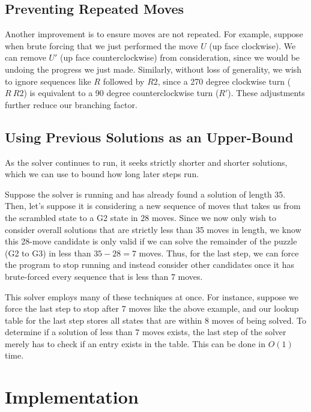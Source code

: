 \documentclass{article}
\begin{document}
\subsection{Preventing Repeated Moves}

Another improvement is to ensure moves are not repeated. For example, suppose when brute forcing that we just performed the move $U$ (up face clockwise). We can remove $U'$ (up face counterclockwise) from consideration, since we would be undoing the progress we just made. Similarly, without loss of generality, we wish to ignore sequences like $R$ followed by $R2$, since a 270 degree clockwise turn ($R\ R2$) is equivalent to a 90 degree counterclockwise turn ($R'$). These adjustments further reduce our branching factor.

\subsection{Using Previous Solutions as an Upper-Bound}

As the solver continues to run, it seeks strictly shorter and shorter solutions, which we can use to bound how long later steps run. 

Suppose the solver is running and has already found a solution of length 35. Then, let's suppose it is considering a new sequence of moves that takes us from the scrambled state to a G2 state in $28$ moves. Since we now only wish to consider overall solutions that are strictly less than 35 moves in length, we know this 28-move candidate is only valid if we can solve the remainder of the puzzle (G2 to G3) in less than $35-28 = 7$ moves. Thus, for the last step, we can force the program to stop running and instead consider other candidates once it has brute-forced every sequence that is less than $7$ moves.

This solver employs many of these techniques at once. For instance, suppose we force the last step to stop after $7$ moves like the above example, and our lookup table for the last step stores all states that are within $8$ moves of being solved. To determine if a solution of less than $7$ moves exists, the last step of the solver merely has to check if an entry exists in the table. This can be done in $O(1)$ time.


\section{Implementation}
\end{document}
